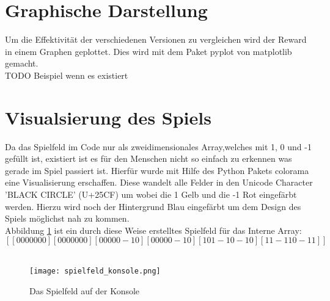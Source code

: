 \section{Graphische Darstellung}
Um die Effektivität der verschiedenen Versionen zu vergleichen wird der Reward in einem Graphen geplottet. Dies wird mit dem Paket pyplot von matplotlib gemacht.\\
\colorbox{red!30}{TODO Beispiel wenn es existiert}

\section{Visualsierung des Spiels}
\label{sec:visualisierung}
Da das Spielfeld im Code nur als zweidimensionales Array,welches mit 1, 0 und -1 gefüllt ist, existiert ist es für den Menschen nicht so einfach zu erkennen was gerade im Spiel passiert ist. Hierfür wurde mit Hilfe des Python Pakets colorama eine Visualisierung erschaffen. Diese wandelt alle Felder in den Unicode Character 'BLACK CIRCLE' (U+25CF) um wobei die 1 Gelb und die -1 Rot eingefärbt werden. Hierzu wird noch der Hintergrund Blau eingefärbt um dem Design des Spiels möglichst nah zu kommen. \\
Abbildung \ref{fig:spielfeld_konsole} ist ein durch diese Weise erstelltes Spielfeld für das Interne Array:
$$[[ 0  0  0  0  0  0  0]
 [ 0  0  0  0  0  0  0]
 [ 0  0  0  0  0 -1  0]
 [ 0  0  0  0  0 -1  0]
 [ 1  0  1 -1  0 -1  0]
 [ 1  1 -1  1  0 -1  1]]$$\\

\begin{figure}[h!]
  \texttt{[image: spielfeld\_konsole.png]}
  \centering
  \caption{Das Spielfeld auf der Konsole}
  \label{fig:spielfeld_konsole}
\end{figure}
